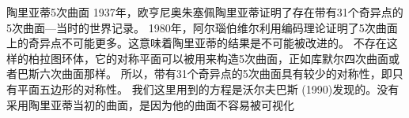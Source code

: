 ﻿\begin{surferPage}{陶里亚蒂5次曲面}
1937年，欧亨尼奥朱塞佩陶里亚蒂证明了存在带有31个奇异点的5次曲面---当时的世界记录。
1980年，阿尔瑙伯维尔利用编码理论证明了5次曲面上的奇异点不可能更多。这意味着陶里亚蒂的结果是不可能被改进的。
不存在这样的柏拉图环体，它的对称平面可以被用来构造5次曲面，正如库默尔四次曲面或者巴斯六次曲面那样。 所以，带有31个奇异点的5次曲面具有较少的对称性，即只有平面五边形的对称性。
我们这里用到的方程是沃尔夫巴斯 (1990)发现的。没有采用陶里亚蒂当初的曲面，是因为他的曲面不容易被可视化
\end{surferPage}
